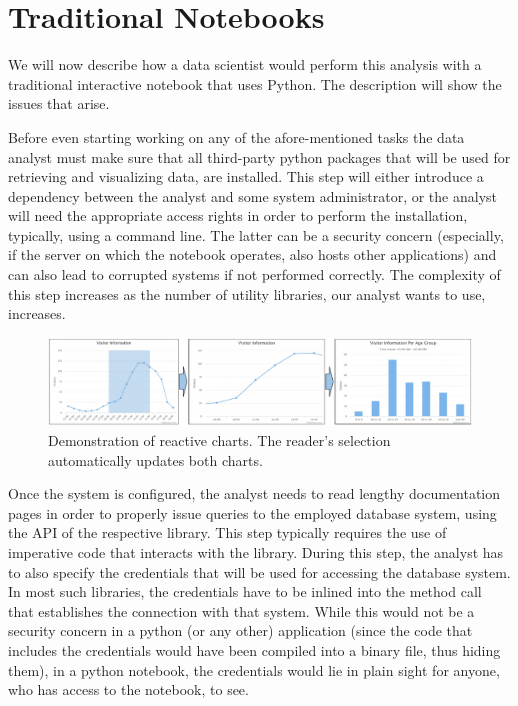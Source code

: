 \section{Traditional Notebooks}



We will now describe how a data scientist would perform this analysis with a traditional interactive notebook that uses Python. The description will show the issues that arise.

 Before even starting working on any of the afore-mentioned tasks the data analyst must make sure that all third-party python packages that will be used for retrieving and visualizing data, are installed. This step will either introduce a dependency between the analyst and some system administrator, or the analyst will need the appropriate access rights in order to perform the installation, typically, using a command line. The latter can be a security concern (especially, if the server on which the notebook operates, also hosts other applications) and can also lead to corrupted systems if not performed correctly. The complexity of this step increases as the number of utility libraries, our analyst wants to use, increases. 

\begin{figure}[hbt!]
\centering
	\includegraphics[width=1\textwidth]{figures/reactive-processing2.pdf}
	\caption{Demonstration of reactive charts. The reader's selection automatically updates both charts.}
	\label{fig:reactive-data-processing}
	\vspace{-10pt}
\end{figure}


Once the system is configured, the analyst needs to read lengthy documentation pages in order to properly issue queries to the employed database system, using the API of the respective library. This step typically requires the use of imperative code that interacts with the library. During this step, the analyst has to also specify the credentials that will be used for accessing the database system. In most such libraries, the credentials have to be inlined into the method call that establishes the connection with that system. While this would not be a security concern in a python (or any other) application (since the code that includes the credentials would have been compiled into a binary file, thus hiding them), in a python notebook, the credentials would lie in plain sight for anyone, who has access to the notebook, to see.


